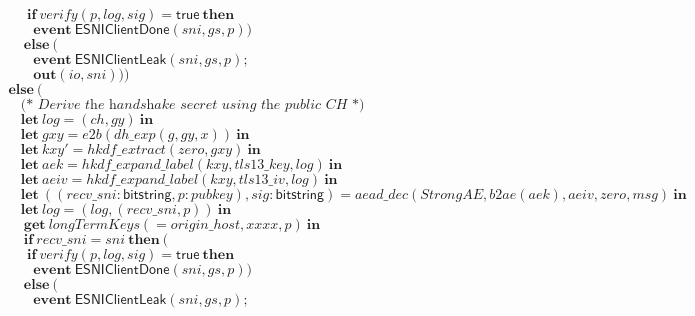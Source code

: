 \documentclass{article}
\theoremstyle{definition}
\newcommand{\kwl}[1]{\mathbf{#1}}
\newcommand{\kwc}[1]{\mathsf{#1}}
\newcommand{\kwt}[1]{\mathsf{#1}}
\newcommand{\kwe}[1]{\mathsf{#1}}
\newcommand{\var}[1]{\mathit{#1}}
\theoremstyle{definition}
\begin{document}
\begin{tabbing}
$\ \ \ \ \ \ \ \ \ \ \kwl{if}\ \var{verify}(\var{p}, \var{log}, \var{sig}) = \kwc{true}\ \kwl{then} $\\
$\ \ \ \ \ \ \ \ \ \ \ \ \kwl{event}\ \kwe{ESNIClientDone}(\var{sni}, \var{gs}, \var{p})) $\\
$\ \ \ \ \ \ \ \ \ \kwl{else}\ ( $\\
$\ \ \ \ \ \ \ \ \ \ \ \ \kwl{event}\ \kwe{ESNIClientLeak}(\var{sni}, \var{gs}, \var{p}); $\\
$\ \ \ \ \ \ \ \ \ \ \ \ \kwl{out}(\var{io}, \var{sni}))) $\\
$\ \ \ \ \kwl{else}\ ( $\\
$\ \ \ \ \ \ \ \ \textit{(* Derive the handshake secret using the public CH *)} $\\
$\ \ \ \ \ \ \ \ \kwl{let}\ \var{log} = (\var{ch}, \var{gy})\ \kwl{in} $\\
$\ \ \ \ \ \ \ \ \kwl{let}\ \var{gxy} = \var{e2b}(\var{dh{\_}exp}(\var{g}, \var{gy}, \var{x}))\ \kwl{in} $\\
$\ \ \ \ \ \ \ \ \kwl{let}\ \var{kxy'} = \var{hkdf{\_}extract}(\var{zero}, \var{gxy})\ \kwl{in} $\\
$\ \ \ \ \ \ \ \ \kwl{let}\ \var{aek} = \var{hkdf{\_}expand{\_}label}(\var{kxy}, \var{tls13{\_}key}, \var{log})\ \kwl{in} $\\
$\ \ \ \ \ \ \ \ \kwl{let}\ \var{aeiv} = \var{hkdf{\_}expand{\_}label}(\var{kxy}, \var{tls13{\_}iv}, \var{log})\ \kwl{in} $\\
$\ \ \ \ \ \ \ \ \kwl{let}\ ((\var{recv{\_}sni}{:}\kwt{bitstring}, \var{p}{:}\var{pubkey}), \var{sig}{:}\kwt{bitstring}) = \var{aead{\_}dec}(\var{StrongAE}, \var{b2ae}(\var{aek}), \var{aeiv}, \var{zero}, \var{msg})\ \kwl{in} $\\
$\ \ \ \ \ \ \ \ \kwl{let}\ \var{log} = (\var{log}, (\var{recv{\_}sni}, \var{p}))\ \kwl{in} $\\
$\ \ \ \ \ \ \ \ \ \kwl{get}\ \var{longTermKeys}( = \var{origin{\_}host}, \var{xxxx}, \var{p})\ \kwl{in} $\\
$\ \ \ \ \ \ \ \ \ \kwl{if}\ \var{recv{\_}sni} = \var{sni}\ \kwl{then}\ ( $\\
$\ \ \ \ \ \ \ \ \ \ \kwl{if}\ \var{verify}(\var{p}, \var{log}, \var{sig}) = \kwc{true}\ \kwl{then} $\\
$\ \ \ \ \ \ \ \ \ \ \ \ \kwl{event}\ \kwe{ESNIClientDone}(\var{sni}, \var{gs}, \var{p})) $\\
$\ \ \ \ \ \ \ \ \ \kwl{else}\ ( $\\
$\ \ \ \ \ \ \ \ \ \ \ \ \kwl{event}\ \kwe{ESNIClientLeak}(\var{sni}, \var{gs}, \var{p}); $\\

\end{tabbing}
\end{document}
